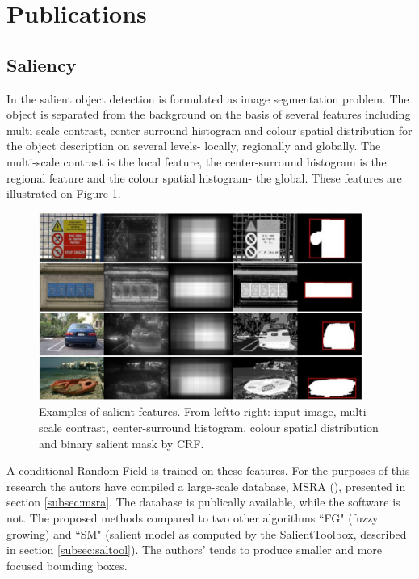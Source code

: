 \section{Publications}
\label{sec:pubs}


\subsection{Saliency}

In \cite{LiuCVPR2007} the salient object detection is formulated as image segmentation problem. The object is separated from the background on the basis of several features including multi-scale contrast, center-surround histogram and colour spatial distribution for the object description on several levels- locally, regionally and globally. The multi-scale contrast is the local feature, the center-surround histogram is the regional feature and the colour spatial histogram- the global. These features are illustrated on Figure \ref{fig:sal_feat_liu07}.
\begin{figure}[H]
\begin{center}
\includegraphics[width=0.95\textwidth]{fig/SalientFeatures_Liu2007}
\end{center}
\caption{Examples of salient features. From leftto right: input image, multi-scale contrast, center-surround histogram, colour spatial distribution and binary salient mask by CRF.}
\label{fig:sal_feat_liu07}
\end{figure}
A conditional Random Field is trained on these features. 
For the purposes of this research the autors have compiled a large-scale database, MSRA (\cite{msra_db}), presented in section \ref{subsec:msra}. The database is publically available, while the software is not. The proposed methods compared to two other algorithms ``FG" (fuzzy growing) and ``SM" (salient model as computed by the SalientToolbox, described in section \ref{subsec:saltool}). The authors' tends to produce smaller and more focused bounding boxes.

